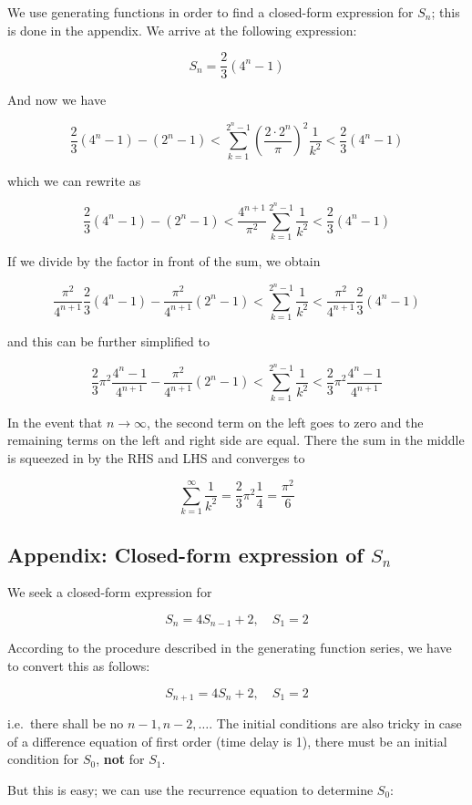 We use generating functions in order to find a closed-form expression for $S_n$; this is done in the appendix. We arrive at the following expression:

\[S_n = \frac{2}{3}(4^n-1)\]

And now we have

\[ \frac{2}{3}(4^n-1) - (2^n-1)  < \sum_{k=1}^{2^n-1} \left( \frac{2 \cdot 2^n}{\pi}\right)^2 \frac{1}{k^2} < \frac{2}{3}(4^n-1) \]

which we can rewrite as

\[ \frac{2}{3}(4^n-1) - (2^n-1)  < \frac{4^{n+1}}{\pi^2} \sum_{k=1}^{2^n-1} \frac{1}{k^2} < \frac{2}{3}(4^n-1) \]

If we divide by the factor in front of the sum, we obtain

\[ \frac{\pi^2}{4^{n+1}} \frac{2}{3}(4^n-1) - \frac{\pi^2}{4^{n+1}} (2^n-1)  < \sum_{k=1}^{2^n-1} \frac{1}{k^2} < \frac{\pi^2}{4^{n+1}} \frac{2}{3}(4^n-1) \]

and this can be further simplified to

\[ \frac{2}{3} \pi^2 \frac{4^n-1}{4^{n+1}} - \frac{\pi^2}{4^{n+1}} (2^n-1) < \sum_{k=1}^{2^n-1} \frac{1}{k^2} < \frac{2}{3} \pi^2 \frac{4^n-1}{4^{n+1}} \]

In the event that $n\rightarrow \infty$, the second term on the left goes to zero and the remaining terms on the left and right side are equal. There the sum in the middle is squeezed in by the RHS and LHS and converges to

\[\sum_{k=1}^\infty \frac{1}{k^2} = \frac{2}{3} \pi^2 \frac{1}{4} = \frac{\pi^2}{6} \]

\subsection{Appendix: Closed-form expression of $S_n$}

We seek a closed-form expression for

\[S_n = 4 S_{n-1} + 2, \quad S_1 = 2\]

According to the procedure described in the generating function series,
we have to convert this as follows:

\[S_{n+1} = 4 S_{n} + 2, \quad S_1 = 2\]

i.e.~there shall be no $n-1,n-2,\ldots$. The initial conditions are also tricky in case of a difference equation of first order (time delay is 1), there must be an initial condition for $S_0$,
\textbf{not} for $S_1$.

But this is easy; we can use the recurrence equation to determine
$S_0$:

